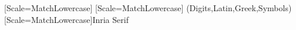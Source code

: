 \usepackage{mathspec}
\setmainfont{Inria Sans}[Scale=MatchLowercase]
\setsansfont{Inria Sans}[Scale=MatchLowercase]
\setmathfont(Digits,Latin,Greek,Symbols)[Scale=MatchLowercase]{Inria Serif}
\usepackage{mathastext}